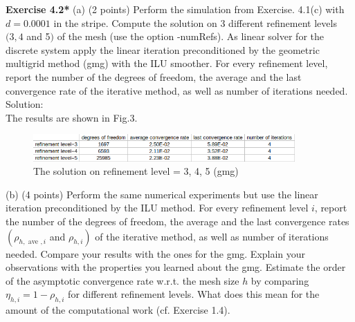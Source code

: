 \documentclass[a4paper]{article}
\begin{document}
\noindent \textbf{Exercise 4.2*} (a) (2 points) Perform the simulation from Exercise. 4.1(c) with $d=0.0001$ in the stripe. Compute the solution on 3 different refinement levels $(3,4$ and 5$)$ of the mesh (use the option -numRefs). As linear solver for the discrete system apply the linear iteration preconditioned by the geometric multigrid method (gmg) with the ILU smoother. For every refinement level, report the number of the degrees of freedom, the average and the last convergence rate of the iterative method, as well as number of iterations needed.\\

\noindent Solution:\\
\noindent The results are shown in Fig.3.\\
\begin{figure}[htbp]
	\centering
	\begin{minipage}[t]{0.7\textwidth}
		\centering		\includegraphics[width=10cm]{4.png}
		\caption{The solution on refinement level = 3, 4, 5 (gmg)}
	\end{minipage}
\end{figure}

\noindent (b) (4 points) Perform the same numerical experiments but use the linear iteration preconditioned by the ILU method. For every refinement level $i$, report the number of the degrees of freedom, the average and the last convergence rates $\left(\rho_{h, \text { ave }, i}\right.$ and $\left.\rho_{h, i}\right)$ of the iterative method, as well as number of iterations needed. Compare your results with the ones for the gmg. Explain your observations with the properties you learned about the gmg. Estimate the order of the asymptotic convergence rate w.r.t. the mesh size $h$ by comparing $\eta_{h, i}=1-\rho_{h, i}$ for different refinement levels. What does this mean for the amount of the computational work (cf. Exercise 1.4).\\
\end{document}
